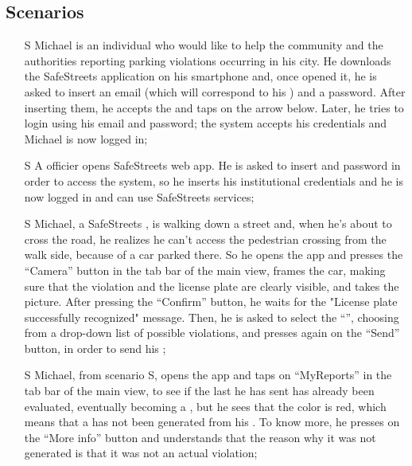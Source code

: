 \documentclass[../../../rasd.tex]{subfiles}
\begin{document}
\subsection{Scenarios\label{sect:3.2.1}}

\begin{itemize}
	\item[S\subs{1}]Michael is an individual who would like to help the community and the authorities reporting parking violations occurring in his city. He downloads the SafeStreets application on his smartphone and, once opened it, he is asked to insert an email (which will correspond to his ) and a password. After inserting them, he accepts the  and taps on the arrow below. Later, he tries to login using his email and password; the system accepts his credentials and Michael is now logged in;
	
	\item[S\subs{2}]A  officier opens SafeStreets web app. He is asked to insert  and password in order to access the system, so he inserts his  institutional credentials and he is now logged in and can use SafeStreets services;
	
	\item[S\subs{3}]Michael, a SafeStreets , is walking down a street and, when he’s about to cross the road, he realizes he can’t access the pedestrian crossing from the walk side, because of a car parked there. So he opens the app and presses the “Camera” button in the tab bar of the main view, frames the car, making sure that the violation and the license plate are clearly visible, and takes the picture. After pressing the “Confirm” button, he waits for the "License plate successfully recognized" message. Then, he is asked to select the “”, choosing from a drop-down list of possible violations, and presses again on the “Send” button, in order to send his ;
	
	\item[S\subs{4}]Michael, from scenario S, opens the app and taps on “MyReports” in the tab bar of the main view, to see if the last  he has sent has already been evaluated, eventually becoming a , but he sees that the  color is red, which means that a  has not been generated from his . To know more, he presses on the “More info” button and understands that the reason why it was not generated is that it was not an actual violation;
	

\end{itemize}
\end{document}
